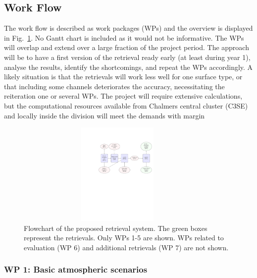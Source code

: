 \documentclass[12pt,oneside,a4paper]{article}
\begin{document}
\subsection{Work Flow}
\label{sec:wp}


The work flow is described as work packages (WPs) and the overview is displayed
in Fig.~\ref{fig:flowchart}. No Gantt chart is included as it would not be
informative. The WPs will overlap and extend over a large fraction of the project
period. The approach will be to have a first version of the retrieval ready early (at least during year 1), analyse the results, identify the shortcomings, and repeat the WPs accordingly. A likely situation is that the retrievals will work less well for one surface type, or that including some channels deteriorates the accuracy, necessitating the reiteration one or several WPs. The project will require extensive calculations, but
the computational resources available from Chalmers central cluster
(C3SE) and locally inside the division will meet the demands with margin

\begin{figure}
	\begin{minipage}[c]{0.75\textwidth}
		\includegraphics[trim=100 400 15 125,clip,height = 50mm, width=100mm]{flowchart.pdf}
	\end{minipage}\hfill
	\begin{minipage}[c]{0.24\textwidth}
		\caption{Flowchart of the proposed retrieval system. The green boxes
          represent the retrievals. Only WPs 1-5 are shown. WPs related to evaluation (WP 6) and additional retrievals (WP 7) are not shown.
		} \label{fig:flowchart}
	\end{minipage}
\end{figure}

\vspace{-1ex}
\subsubsection*{WP 1: Basic atmospheric scenarios}
%
\end{document}
